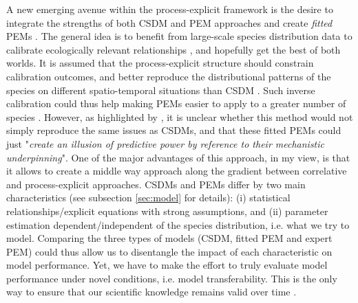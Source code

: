 A new emerging avenue within the process-explicit framework is the desire to integrate the strengths of both CSDM and PEM approaches and create \emph{fitted} PEMs \citep{Dormann2012}. The general idea is to benefit from large-scale species distribution data to calibrate ecologically relevant relationships \citep{Kriticos2013, Higgins2012}, and hopefully get the best of both worlds. It is assumed that the process-explicit structure should constrain calibration outcomes, and better reproduce the distributional patterns of the species on different spatio-temporal situations than CSDM \citep{Higgins2020}. Such inverse calibration could thus help making PEMs easier to apply to a greater number of species \citep{Evans2016, Conradi2024}. However, as highlighted by \citet{Schymanski2013}, it is unclear whether this method would not simply reproduce the same issues as CSDMs, and that these fitted PEMs could just "\emph{create an illusion of predictive power by reference to their mechanistic underpinning}". One of the major advantages of this approach, in my view, is that it allows to create a middle way approach along the gradient between correlative and process-explicit approaches. CSDMs and PEMs differ by two main characteristics (see subsection \autoref{sec:model} for details): (i) statistical relationships/explicit equations with strong assumptions, and (ii) parameter estimation dependent/independent of the species distribution, i.e. what we try to model. Comparing the three types of models (CSDM, fitted PEM and expert PEM) could thus allow us to disentangle the impact of each characteristic on model performance. Yet, we have to make the effort to truly evaluate model performance under novel conditions, i.e. model transferability. This is the only way to ensure that our scientific knowledge remains valid over time \citep{Houlahan2017}.



